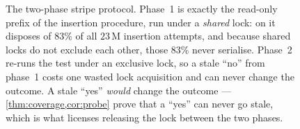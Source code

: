 {\begin{figure}[tb]
\begin{tikzpicture}[x=1mm,y=1mm]
\end{tikzpicture}
\caption{The two-phase stripe protocol.  Phase~1 is exactly the read-only
prefix of the insertion procedure, run under a \emph{shared} lock: on
 it disposes of $83\%$ of all $23$\,M insertion attempts, and
because shared locks do not exclude each other, those $83\%$ never serialise.
Phase~2 re-runs the test under an exclusive lock, so a stale ``no'' from
phase~1 costs one wasted lock acquisition and can never change the outcome.  A
stale ``yes'' \emph{would} change the outcome ---
\cref{thm:coverage,cor:probe} prove that a ``yes'' can never go stale, which is
what licenses releasing the lock between the two phases.}
\label{fig:protocol}
\end{figure}}
